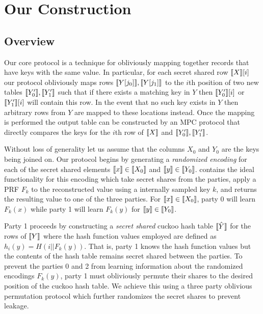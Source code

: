 \section{Our Construction}\label{sec:construction}



\subsection{Overview}

Our core protocol is a technique for obliviously mapping together records that have keys with the same value. In particular, for each secret shared row $\llbracket X\rrbracket[i]$ our protocol obliviously maps rows $\llbracket Y[j_0]\rrbracket,\llbracket Y[j_1]\rrbracket$ to the $i$th position of two new tables $\llbracket Y'_0\rrbracket,\llbracket Y'_1\rrbracket$ such that if there exists a matching key in $Y$ then $\llbracket Y'_0\rrbracket[i]$ or $\llbracket Y'_1\rrbracket[i]$ will contain this row. In the event that no such key exists in $Y$ then arbitrary rows from $Y$ are mapped to these locations instead. Once the mapping is performed the output table can be constructed by an MPC protocol\cite{aby3} that directly compares the keys for the $i$th row of $\llbracket X\rrbracket$ and $\llbracket Y'_0\rrbracket,\llbracket Y'_1\rrbracket$. 

Without loss of generality let us assume that the columns $X_0$ and $Y_0$ are the keys being joined on. Our protocol begins by generating a \emph{randomized encoding} for each of the secret shared elements $\llbracket x\rrbracket\in \llbracket X_0\rrbracket$ and $ \llbracket y\rrbracket\in \llbracket Y_0\rrbracket$.  contains the ideal functionality for this encoding which take secret shares from the parties, apply a PRF $F_k$ to the reconstructed value using a internally sampled key $k$, and returns the resulting value to one of the three parties. For $\llbracket x\rrbracket\in \llbracket X_0\rrbracket$, party 0 will learn $F_k(x)$ while party 1 will learn $F_k(y)$ for $\llbracket y\rrbracket\in \llbracket Y_0\rrbracket$.

Party 1 proceeds by constructing a \emph{secret shared} cuckoo hash table $\llbracket \hat Y\rrbracket$ for the rows of $\llbracket Y\rrbracket$ where the hash function values employed are defined as $h_i(y) = H( i || F_k(y))$. That is, party 1 knows the hash function values but the contents of the hash table remains secret shared between the parties. To prevent the parties 0 and 2 from learning information about the randomized encodings $F_k(y)$, party 1 must obliviously permute their shares to the desired position of the cuckoo hash table. We achieve this using a three party oblivious permutation protocol which further randomizes the secret shares to prevent leakage.

